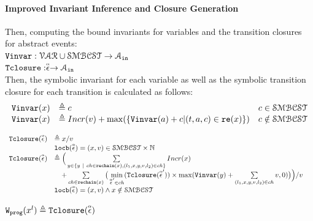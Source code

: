 \paragraph*{Improved Invariant Inference and Closure Generation}
Then, computing the bound invariants for variables and the transition closures for abstract events:
\\ 
$ {\mathtt{Vinvar}}: \mathcal{VAR} \cup \mathcal{SMBCST} \to \mathcal{A}_{\mathtt{in}}$
\\
${\mathtt{Tclosure}}: \stackrel{\scriptscriptstyle{\alpha}}{\mathtt{\epsilon}{}} \to \mathcal{A}_{\mathtt{in}}$
\\
Then, the symbolic invariant for each variable 
as well as the symbolic transition closure for each transition is calculated as follows:
\[ 
\begin{array}{lll}
  {\ensuremath{\mathtt{Vinvar}}}(x) & \triangleq c & c \in \mathcal{SMBCST} \\
  {\mathtt{Vinvar}}(x) & \triangleq Incr(v) + \max(\{{\mathtt{Vinvar}}(a) + c | (t, a, c) \in \mathtt{re}(x)\}) & c \notin \mathcal{SMBCST}
\end{array}
\]
%
\begin{defn}
  \label{def:transition_closure}
\[ 
\begin{array}{lll}
  {\ensuremath{\mathtt{Tclosure}}}(\stackrel{\scriptscriptstyle{\alpha}}{\mathtt{\epsilon}{}}) 
  & \triangleq x / v & \\ 
  & \mathtt{locb}(\stackrel{\scriptscriptstyle{\alpha}}{\mathtt{\epsilon}{}}) = (x, v) \in \mathcal{SMBCST} \times \mathbb{N} & \\
  {\mathtt{Tclosure}}(\stackrel{\scriptscriptstyle{\alpha}}{\mathtt{\epsilon}{}}) 
  & \triangleq \Big(
    \sum\limits_{y \in \{ y ~|~ 
    ch \in \mathtt{rechain}(x), (l_1, x, y, v, l_2) \in ch \} } Incr(x) & \\
    & \quad + 
  \sum\limits_{ch \in \mathtt{rechain}(x)}
  \big( \min\limits_{\stackrel{\scriptscriptstyle{\alpha}}{\mathtt{\epsilon}{}}' \in ch}({{\mathtt{Tclosure}}(\stackrel{\scriptscriptstyle{\alpha}}{\mathtt{\epsilon}{}}')}) \times 
  \max({\mathtt{Vinvar}}(y) + \sum\limits_{(l_1, x, y, v, l_2) \in ch } v, 0)\big) \Big) / v & \\
  & \mathtt{locb}(\stackrel{\scriptscriptstyle{\alpha}}{\mathtt{\epsilon}{}}) = (x, v) \land x \notin \mathcal{SMBCST} & 
\end{array}
  \]
\end{defn}
$
\mathtt{{W_{prog}}}(x^l) 
  \triangleq {\ensuremath{\mathtt{Tclosure}}}(\stackrel{\scriptscriptstyle{\alpha}}{\mathtt{\epsilon}{}})
$
